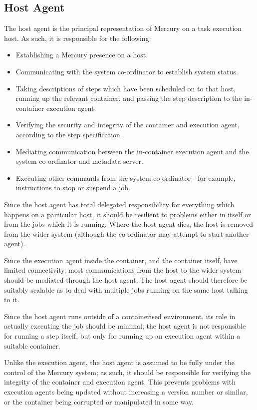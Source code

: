 \documentclass[10pt,a4paper]{article}
\newcommand{\npar}{\par\noindent\space}
\begin{document}
\subsection{Host Agent}
\npar The host agent is the principal representation of Mercury on a task execution host. As such, it is responsible for the following:
\begin{itemize}
\item Establishing a Mercury presence on a host.
\item Communicating with the system co-ordinator to establish system status.
\item Taking descriptions of steps which have been scheduled on to that host, running up the relevant container, and passing the step description to the in-container execution agent.
\item Verifying the security and integrity of the container and execution agent, according to the step specification.
\item Mediating communication between the in-container execution agent and the system co-ordinator and metadata server.
\item Executing other commands from the system co-ordinator - for example, instructions to stop or suspend a job.
\end{itemize}
\npar Since the host agent has total delegated responsibility for everything which happens on a particular host, it should be resilient to problems either in itself or from the jobs which it is running. Where the host agent dies, the host is removed from the wider system (although the co-ordinator may attempt to start another agent). 
\npar Since the execution agent inside the container, and the container itself, have limited connectivity, most communications from the host to the wider system should be mediated through the host agent. The host agent should therefore be suitably scalable as to deal with multiple jobs running on the same host talking to it.
\npar Since the host agent runs outside of a containerised environment, its role in actually executing the job should be minimal; the host agent is not responsible for running a step itself, but only for running up an execution agent within a suitable container.
\npar Unlike the execution agent, the host agent is assumed to be fully under the control of the Mercury system; as such, it should be responsible for verifying the integrity of the container and execution agent. This prevents problems with execution agents being updated without increasing a version number or similar, or the container being corrupted or manipulated in some way.
\end{document}

